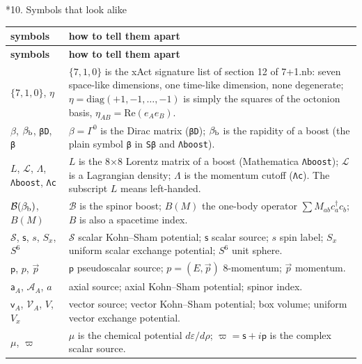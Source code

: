 \documentclass[10pt,a4paper]{article}
\makeatletter
\renewcommand\section{\@startsection{section}{1}{\z@}{-3.5ex \@plus -1ex \@minus -.2ex}{2.3ex \@plus.2ex}{\normalfont\Large\bfseries\raggedright}}
\makeatother
\begin{document}
\section*{10. Symbols that look alike}
{\small
\begin{longtable}{>{\raggedright\arraybackslash}p{}>{\raggedright\arraybackslash}p{}}
\toprule
\textbf{symbols} & \textbf{how to tell them apart} \\
\midrule\endfirsthead
\toprule
\textbf{symbols} & \textbf{how to tell them apart} \\
\midrule\endhead
\endfoot
\bottomrule\endlastfoot
$\{7,1,0\}$, $\eta$ & $\{7,1,0\}$ is the xAct signature list of section 12 of 7+1.nb: seven space-like dimensions, one time-like dimension, none degenerate; $\eta=\mathrm{diag}(+1,-1,\dots,-1)$ is simply the squares of the octonion basis, $\eta_{AB}=\mathrm{Re}(e_Ae_B)$. \\
$\beta$, $\beta_{\rm b}$, \texttt{βD}, \texttt{β} & $\beta=\Gamma^0$ is the Dirac matrix (\texttt{βD}); $\beta_{\rm b}$ is the rapidity of a boost (the plain symbol \texttt{β} in \texttt{Sβ} and \texttt{Λboost}). \\
$L$, $\mathcal L$, $\Lambda$, \texttt{Λboost}, \texttt{Λc} & $L$ is the 8×8 Lorentz matrix of a boost (Mathematica \texttt{Λboost}); $\mathcal L$ is a Lagrangian density; $\Lambda$ is the momentum cutoff (\texttt{Λc}). The subscript $L$ means left-handed. \\
$\mathcal B(\beta_{\rm b})$, $B(M)$ & $\mathcal B$ is the spinor boost; $B(M)$ the one-body operator $\sum M_{ab}c_a^\dagger c_b$; $B$ is also a spacetime index. \\
$\mathcal S$, $\mathsf s$, $s$, $S_x$, $S^6$ & $\mathcal S$ scalar Kohn–Sham potential; $\mathsf s$ scalar source; $s$ spin label; $S_x$ uniform scalar exchange potential; $S^6$ unit sphere. \\
$\mathsf p$, $p$, $\vec p$ & $\mathsf p$ pseudoscalar source; $p=(E,\vec p)$ 8-momentum; $\vec p$ momentum. \\
$\mathsf a_A$, $\mathcal A_A$, $a$ & axial source; axial Kohn–Sham potential; spinor index. \\
$\mathsf v_A$, $\mathcal V_A$, $V$, $V_x$ & vector source; vector Kohn–Sham potential; box volume; uniform vector exchange potential. \\
$\mu$, $\varpi$ & $\mu$ is the chemical potential $d\varepsilon/d\rho$; $\varpi=\mathsf s+i\mathsf p$ is the complex scalar source. \\

\end{longtable}}
\end{document}
